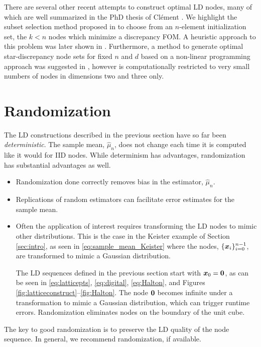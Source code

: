 \documentclass{svproc}
\begin{document}
There are several other recent attempts to construct optimal LD nodes, many of which are well summarized in the PhD thesis of Cl\'{e}ment \cite{clethesis24}. We highlight the subset selection method proposed in \cite{cle22} to choose from an $n$-element initialization set, the $k<n$ nodes which minimize a discrepancy FOM. A heuristic approach to this problem was later shown in \cite{cle24_heuristic}. Furthermore, a method to generate optimal star-discrepancy node sets for fixed $n$ and $d$ based on a non-linear programming approach was suggested in \cite{cle24}, however is computationally restricted to very small numbers of nodes in dimensions two and three only.




\section{Randomization} \label{sec:random}
The LD constructions described in the previous section have so far been \emph{deterministic}. The sample mean, $\hat{\mu}_n$, does not change each time it is computed like it would for IID nodes. While determinism has advantages, randomization has substantial advantages as well.
\begin{itemize}
	\item Randomization done correctly removes bias in the estimator, $\hat{\mu}_n$.
	\item Replications of random estimators can facilitate error estimates for the sample mean.
	\item Often the application of interest requires transforming the LD nodes to mimic other distributions.  This is the case in the Keister example of Section \ref{sec:intro}, as seen in \eqref{eq:sample_mean_Keister} where the nodes, $\{{\boldsymbol{x}}_i\}_{i=0}^{n-1}$, are transformed to mimic a Gaussian distribution.

	The LD sequences defined in the previous section start with ${\boldsymbol{x}}_0 = {\boldsymbol{0}}$, as can be seen in \eqref{eq:latticepts}, \eqref{eq:digital}, \eqref{eq:Halton}, and Figures \ref{fig:latticeconstruct}--\ref{fig:Halton}.  The node ${\boldsymbol{0}}$ becomes infinite under a transformation to mimic a Gaussian distribution, which can trigger runtime errors.  Randomization eliminates nodes on the boundary of the unit cube.
\end{itemize}
The key to good randomization is to preserve the LD quality of the node sequence.  In general, we recommend randomization, if available.
\end{document}
